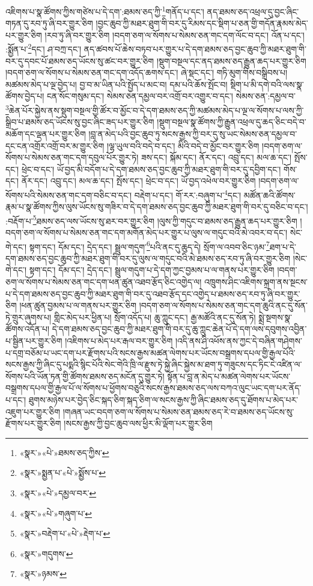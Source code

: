 འཇིགས་པ་སྣ་ཚོགས་ཀྱིས་གཙེས་པ་དེ་དག་:ཐམས་ཅད་ཀྱི་\footnote{«སྣར་»«པེ་»ཐམས་ཅད་ཀྱིས་}གནོད་པ་དང་། ནད་ཐམས་ཅད་འཕྲལ་དུ་བྱང་ཞིང་གཏན་དུ་རབ་ཏུ་ཞི་བར་གྱུར་ཅིག །བྱང་ཆུབ་ཀྱི་མཐར་ཐུག་གི་བར་དུ་རིམས་དང་སྡིག་པ་ཅན་གྱི་གདོན་རྣམས་མེད་པར་གྱུར་ཅིག །རབ་ཏུ་ཞི་བར་གྱུར་ཅིག །བདག་ཅག་ལ་སོགས་པ་སེམས་ཅན་གང་དག་ལོང་བ་དང་། འོན་པ་དང་། :སྨྱོན་པ་\footnote{«སྣར་»སྨྱན་པ་«པེ་»སྨྱོས་པ་}དང་། ཤ་བཀྲ་དང་། ནད་ཚབས་པོ་ཆེས་བཏབ་པར་གྱུར་པ་དེ་དག་ཐམས་ཅད་བྱང་ཆུབ་ཀྱི་མཐར་ཐུག་གི་བར་དུ་དབང་པོ་ཐམས་ཅད་ཡོངས་སུ་ཚང་བར་གྱུར་ཅིག །སྡུག་བསྔལ་དང་ནད་ཐམས་ཅད་རྒྱུན་ཆད་པར་གྱུར་ཅིག །བདག་ཅག་ལ་སོགས་པ་སེམས་ཅན་གང་དག་འདོད་ཆགས་དང་། ཞེ་སྡང་དང་། གཏི་མུག་གིས་བསྒྲིབས་པ། མཚམས་མེད་པ་ལྔ་བྱེད་པ། བྱ་བ་མ་ཡིན་པའི་སྤྱོད་པ་མང་བ། དམ་པའི་ཆོས་སྤོང་བ། སྡིག་པ་མི་དགེ་བའི་ལས་སྣ་ཚོགས་བྱེད་པ། ངན་སོང་གསུམ་དང་། སེམས་ཅན་དམྱལ་བར་འགྲོ་བར་འགྱུར་བ་དང་། སེམས་ཅན་:དམྱལ་བ་\footnote{«སྣར་»«པེ་»དམྱལ་བར་}ཆེན་པོར་སྐྱེས་ནས་སྡུག་བསྔལ་གྱི་ཚོར་བ་མྱོང་བ་དེ་དག་ཐམས་ཅད་ཀྱི་མཚམས་མེད་པ་ལྔ་ལ་སོགས་པ་ལས་ཀྱི་སྒྲིབ་པ་ཐམས་ཅད་ཡོངས་སུ་བྱང་ཞིང་ཟད་པར་གྱུར་ཅིག །སྡུག་བསྔལ་སྣ་ཚོགས་ཀྱི་རྒྱུན་འཕྲལ་དུ་ཆད་ཅིང་བདེ་བ་མཆོག་དང་ལྡན་པར་གྱུར་ཅིག །བླ་ན་མེད་པའི་བྱང་ཆུབ་ཏུ་སངས་རྒྱས་ཀྱི་བར་དུ་སུ་ཡང་སེམས་ཅན་དམྱལ་བ་དང་ངན་འགྲོར་འགྲོ་བར་མ་གྱུར་ཅིག །ལྷ་ཡུལ་བའི་བདེ་བ་དང་། མིའི་བདེ་བ་མྱོང་བར་གྱུར་ཅིག །བདག་ཅག་ལ་སོགས་པ་སེམས་ཅན་གང་དག་དབུལ་པོར་གྱུར་ཏེ། ཟས་དང་། སྐོམ་དང་། ནོར་དང་། འབྲུ་དང་། མལ་ཆ་དང་། སྤོས་དང་། ཕྲེང་བ་དང་། ཡོ་བྱད་མི་བདོག་པ་དེ་དག་ཐམས་ཅད་བྱང་ཆུབ་ཀྱི་མཐར་ཐུག་གི་བར་དུ་དབྱིག་དང་། གོས་དང་། ནོར་དང་། འབྲུ་དང་། མལ་ཆ་དང་། སྤོས་དང་། ཕྲེང་བ་དང་། ཡོ་བྱད་འཕེལ་བར་གྱུར་ཅིག །བདག་ཅག་ལ་སོགས་པའི་སེམས་ཅན་གང་དག་བཅིང་བ་དང་། བརྡེག་པ་དང་། གོ་རར་:བཞུག་པ་\footnote{«སྣར་»«པེ་»གཞུག་པ་}དང་། མཚོན་ཆའི་ཚོགས་རྣམ་པ་སྣ་ཚོགས་ཀྱིས་ལུས་ཡོངས་སུ་གཟིར་བ་དེ་དག་ཐམས་ཅད་བྱང་ཆུབ་ཀྱི་མཐར་ཐུག་གི་བར་དུ་བཅིང་བ་དང་། :བརྡོག་པ་\footnote{«སྣར་»བརྡེག་པ་«པེ་»རྡེག་པ་}ཐམས་ཅད་ལས་ཡོངས་སུ་ཐར་བར་གྱུར་ཅིག །ལུས་ཀྱི་གདུང་བ་ཐམས་ཅད་རྒྱུན་ཆད་པར་གྱུར་ཅིག །བདག་ཅག་ལ་སོགས་པ་སེམས་ཅན་གང་དག་མགོན་མེད་པར་གྱུར་པ་ལུས་ལ་གདུང་བའི་མེ་འབར་བ་དང་། སེང་གེ་དང་། སྟག་དང་། དོམ་དང་། དྲེད་དང་། སྦྲུལ་གདུག་\footnote{«སྣར་»གདུགས་}པའི་ནང་དུ་ཆུད་དེ། སྲོག་ལ་འབབ་ཅིང་ཉམ་\footnote{«སྣར་»ཉམས་}ཐག་པ་དེ་དག་ཐམས་ཅད་བྱང་ཆུབ་ཀྱི་མཐར་ཐུག་གི་བར་དུ་ལུས་ལ་གདུང་བའི་མེ་ཐམས་ཅད་རབ་ཏུ་ཞི་བར་གྱུར་ཅིག །སེང་གེ་དང་། སྟག་དང་། དོམ་དང་། དྲེད་དང་། སྦྲུལ་གདུག་པ་དེ་དག་ཀྱང་བྱམས་པ་ལ་གནས་པར་གྱུར་ཅིག །བདག་ཅག་ལ་སོགས་པ་སེམས་ཅན་གང་དག་ཕན་ཚུན་འཐབ་རྩོད་ཅིང་འགྱེད་ལ། འཁྲུགས་ཤིང་འཇིགས་སྐྲག་ནས་སྔངས་པ་དེ་དག་ཐམས་ཅད་བྱང་ཆུབ་ཀྱི་མཐར་ཐུག་གི་བར་དུ་འཐབ་རྩོད་དང་འགྱེད་པ་ཐམས་ཅད་རབ་ཏུ་ཞི་བར་གྱུར་ཅིག །ཕན་ཚུན་བྱམས་པ་ལ་གནས་པར་གྱུར་ཅིག །བདག་ཅག་ལ་སོགས་པ་སེམས་ཅན་གང་དག་ཆུའི་ནང་དུ་སོན་ཏེ་གྲུར་ཞུགས་པ། གླིང་མེད་པར་ཕྱིན་པ། སྲོག་འདོད་པ། ཆུ་ཀླུང་དང་། རྒྱ་མཚོའི་ནང་དུ་སོན་ཏེ། སྨྲེ་སྔགས་སྣ་ཚོགས་འདོན་པ། དེ་དག་ཐམས་ཅད་བྱང་ཆུབ་ཀྱི་མཐར་ཐུག་གི་བར་དུ་ཆུ་ཀླུང་ཆེན་པོ་དེ་དག་ལས་དབུགས་འབྱིན་པ་སྦྱིན་པར་གྱུར་ཅིག །འཇིགས་པ་མེད་པར་རྒལ་བར་གྱུར་ཅིག །འདི་ནས་ཤི་འཕོས་ནས་ཀྱང་དེ་བཞིན་གཤེགས་པ་དགྲ་བཅོམ་པ་ཡང་དག་པར་རྫོགས་པའི་སངས་རྒྱས་མཚན་ལེགས་པར་ཡོངས་བསྒྲགས་དཔལ་གྱི་རྒྱལ་པོའི་སངས་རྒྱས་ཀྱི་ཞིང་དུ་པདྨའི་སྙིང་པོའི་སེང་གེའི་ཁྲི་ལ་རྫུས་ཏེ་སྐྱེ་ཞིང་སྐྱེས་མ་ཐག་ཏུ་གཟུངས་དང་ཏིང་ངེ་འཛིན་ལ་སོགས་པའི་ཡོན་ཏན་གྱི་ཚོགས་ཐམས་ཅད་མངོན་དུ་གྱུར་ཏེ། སྟོན་པ་བླ་ན་མེད་པ་མཚན་ལེགས་པར་ཡོངས་བསྒྲགས་དཔལ་གྱི་རྒྱལ་པོ་ལ་སོགས་པ་ཕྱོགས་བཅུའི་སངས་རྒྱས་ཐམས་ཅད་ལས་བཀའ་ལུང་ཡང་དག་པར་ནོད་པ་དང་། ཐུགས་མཉེས་པར་བྱེད་ཅིང་སྐད་ཅིག་སྐད་ཅིག་ལ་སངས་རྒྱས་ཀྱི་ཞིང་ཐམས་ཅད་དུ་ཐོགས་པ་མེད་པར་འཇུག་པར་གྱུར་ཅིག །གཞན་ཡང་བདག་ཅག་ལ་སོགས་པ་སེམས་ཅན་ཐམས་ཅད་རེ་བ་ཐམས་ཅད་ཡོངས་སུ་རྫོགས་པར་གྱུར་ཅིག །སངས་རྒྱས་ཀྱི་བྱང་ཆུབ་ལས་ཕྱིར་མི་ལྡོག་པར་གྱུར་ཅིག 